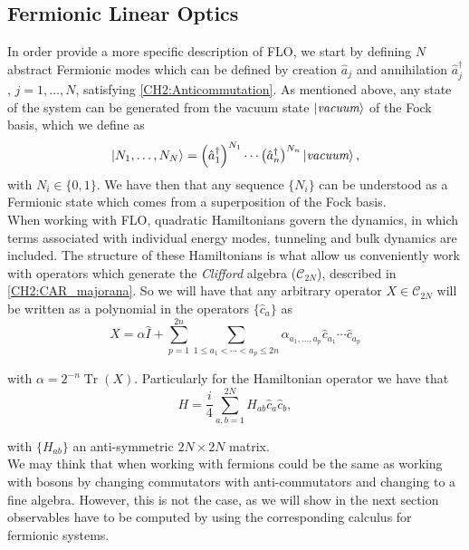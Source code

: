 \subsection{Fermionic Linear Optics}
In order provide a more specific description of FLO, we start by defining $N$ abstract Fermionic modes which can be defined by creation $\hat{a}_j$ and annihilation $\hat{a}_j^{\dagger}$, $j=1,\ldots,N$, satisfying \eqref{CH2:Anticommutation}. As mentioned above, any state of the system can be generated from the vacuum state $\mathinner{|{\textit{vacuum}}\rangle}$ of the Fock basis, which we define as
\begin{equation}
\mathinner{|{N_1,\ldots,N_{N}}\rangle} = \left(\hat{a}_{1}^{\dagger}\right)^{N_{1}} \cdots\left(\hat{a}_{n}^{\dagger}\right)^{N_{n}}\left|\textit{vacuum}\right\rangle,
\label{CH2:Fock_Space}
\end{equation}
with $N_i\in \{0,1\}$. We have then that any sequence $\{N_i\}$ can be understood as a Fermionic state which comes from a superposition of the Fock basis.\\
When working with FLO, quadratic Hamiltonians govern the dynamics, in which terms associated with individual energy modes, tunneling and bulk dynamics are included. The structure of these Hamiltonians is what allow us conveniently work with operators which generate the \textit{Clifford} algebra ($\mathcal{C}_{2N}$), described in \eqref{CH2:CAR_majorana}. So we will have that any arbitrary operator $X\in \mathcal{C}_{2N}$ will be written as a polynomial in the operators $\{\hat{c}_a\}$ as
\begin{equation}
X=\alpha \hat{I}+\sum_{p=1}^{2 n} \sum_{1 \leq a_{1}<\cdots<a_{p} \leq 2 n} \alpha_{a_{1}, \ldots, a_{p}} \hat{c}_{a_{1}} \cdots \hat{c}_{a_{p}}
\label{CH2:operators_in_clifford}
\end{equation}

with $\alpha=2^{-n} \operatorname{Tr}(X)$. Particularly for the Hamiltonian operator we have that
\begin{equation}
H=\frac{i}{4} \sum_{a, b=1}^{2 N} H_{a b} \hat{c}_{a} \hat{c}_{b},
\label{CH2:Hamiltonian_in_CLifford}
\end{equation}

with $\{H_{a b}\}$ an anti-symmetric $2N\times 2N$ matrix.\\
We may think that when working with fermions could be the same as working with bosons by changing commutators with anti-commutators and changing to a fine algebra. However, this is not the case, as we will show in the next section observables have to be computed by using the corresponding calculus for fermionic systems.

